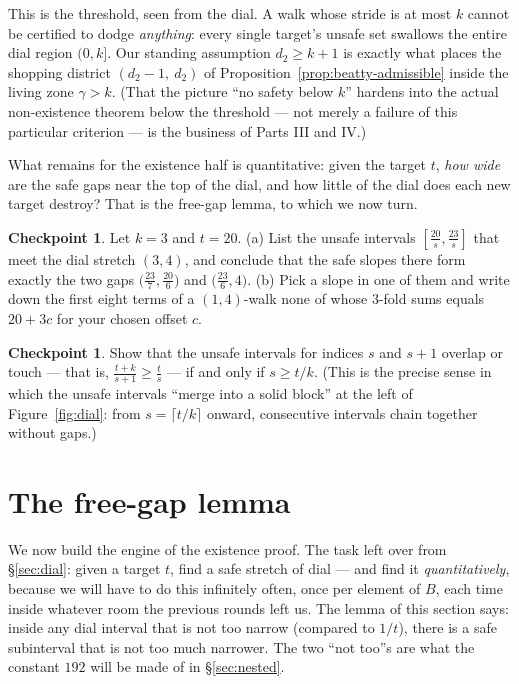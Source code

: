 \documentclass[11pt,reqno]{amsart}
\theoremstyle{plain}
\theoremstyle{definition}
\newtheorem{checkpoint}[theorem]{Checkpoint}   %
\theoremstyle{remark}
\begin{document}
This is the threshold, seen from the dial. A walk whose stride is at most $k$ cannot
be certified to dodge \emph{anything}: every single target's unsafe set swallows the
entire dial region $(0, k]$. Our standing assumption $d_2 \ge k+1$ is exactly what
places the shopping district $(d_2 - 1,\ d_2)$ of
Proposition~\ref{prop:beatty-admissible} inside the living zone $\gamma > k$. (That
the picture ``no safety below $k$'' hardens into the actual non-existence theorem
below the threshold --- not merely a failure of this particular criterion --- is the
business of Parts III and IV.)

What remains for the existence half is quantitative: given the target $t$, \emph{how
wide} are the safe gaps near the top of the dial, and how little of the dial does each
new target destroy? That is the free-gap lemma, to which we now turn.

\begin{checkpoint}
Let $k = 3$ and $t = 20$. (a) List the unsafe intervals
$[\frac{20}{s}, \frac{23}{s}]$ that meet the dial stretch $(3, 4)$, and conclude that
the safe slopes there form exactly the two gaps
$\big(\tfrac{23}{7}, \tfrac{20}{6}\big)$ and $\big(\tfrac{23}{6}, 4\big)$.
(b) Pick a slope in one of them and write down the first eight terms of a
$(1,4)$-walk none of whose $3$-fold sums equals $20 + 3c$ for your chosen offset $c$.
\end{checkpoint}

\begin{checkpoint}\label{chk:overlap}
Show that the unsafe intervals for indices $s$ and $s+1$ overlap or touch --- that
is, $\frac{t+k}{s+1} \ge \frac{t}{s}$ --- if and only if $s \ge t/k$. (This is the
precise sense in which the unsafe intervals ``merge into a solid block'' at the left
of Figure~\ref{fig:dial}: from $s = \lceil t/k \rceil$ onward, consecutive intervals
chain together without gaps.)
\end{checkpoint}

\section{The free-gap lemma}\label{sec:freegap}

We now build the engine of the existence proof. The task left over from
\S\ref{sec:dial}: given a target $t$, find a safe stretch of dial --- and find it
\emph{quantitatively}, because we will have to do this infinitely often, once per
element of $B$, each time inside whatever room the previous rounds left us. The lemma
of this section says: inside any dial interval that is not too narrow (compared to
$1/t$), there is a safe subinterval that is not too much narrower. The two ``not
too''s are what the constant $192$ will be made of in \S\ref{sec:nested}.
\end{document}
